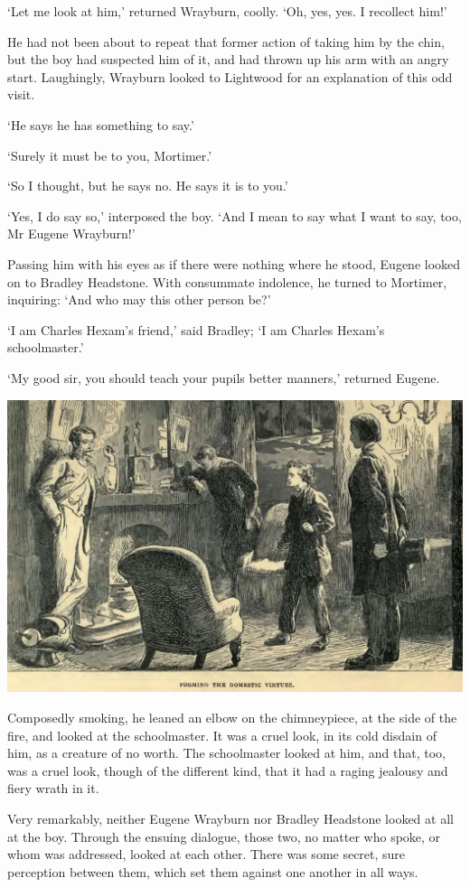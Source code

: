 ‘Let me look at him,’ returned Wrayburn, coolly. ‘Oh, yes, yes. I
recollect him!’

He had not been about to repeat that former action of taking him by the
chin, but the boy had suspected him of it, and had thrown up his arm
with an angry start. Laughingly, Wrayburn looked to Lightwood for an
explanation of this odd visit.

‘He says he has something to say.’

‘Surely it must be to you, Mortimer.’

‘So I thought, but he says no. He says it is to you.’

‘Yes, I do say so,’ interposed the boy. ‘And I mean to say what I want
to say, too, Mr Eugene Wrayburn!’

Passing him with his eyes as if there were nothing where he stood,
Eugene looked on to Bradley Headstone. With consummate indolence, he
turned to Mortimer, inquiring: ‘And who may this other person be?’

‘I am Charles Hexam’s friend,’ said Bradley; ‘I am Charles Hexam’s
schoolmaster.’

‘My good sir, you should teach your pupils better manners,’ returned
Eugene.

\includegraphics[scale=2.3]{02-06-01}

Composedly smoking, he leaned an elbow on the chimneypiece, at the side
of the fire, and looked at the schoolmaster. It was a cruel look, in its
cold disdain of him, as a creature of no worth. The schoolmaster looked
at him, and that, too, was a cruel look, though of the different kind,
that it had a raging jealousy and fiery wrath in it.

Very remarkably, neither Eugene Wrayburn nor Bradley Headstone looked at
all at the boy. Through the ensuing dialogue, those two, no matter
who spoke, or whom was addressed, looked at each other. There was some
secret, sure perception between them, which set them against one another
in all ways.

